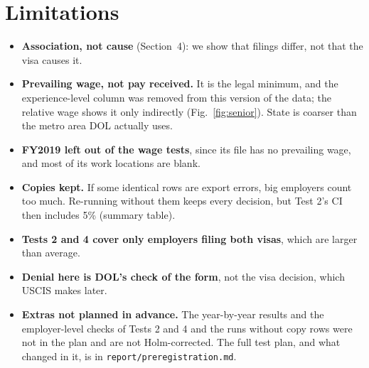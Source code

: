 \documentclass[10pt,a4paper,twocolumn]{article}
\newcommand{\code}[1]{\texttt{#1}}
\begin{document}
\section{Limitations}
\begin{itemize}
  \item \textbf{Association, not cause} (Section~4): we show that filings differ, not that the
  visa causes it.
  \item \textbf{Prevailing wage, not pay received.} It is the legal minimum, and the
  experience-level column was removed from this version of the data; the relative wage shows it
  only indirectly (Fig.~\ref{fig:senior}). State is coarser than the metro area DOL actually uses.
  \item \textbf{FY2019 left out of the wage tests}, since its file has no prevailing wage, and
  most of its work locations are blank.
  \item \textbf{Copies kept.} If some identical rows are export errors, big employers count too
  much. Re-running without them keeps every decision, but Test 2's CI then includes 5\% (summary
  table).
  \item \textbf{Tests 2 and 4 cover only employers filing both visas}, which are larger than average.
  \item \textbf{Denial here is DOL's check of the form}, not the visa decision, which USCIS makes later.
  \item \textbf{Extras not planned in advance.} The year-by-year results and the employer-level
  checks of Tests 2 and 4 and the runs without copy rows were not in the plan and are not
  Holm-corrected. The full test plan, and
  what changed in it, is in \code{report/preregistration.md}.
\end{itemize}
\end{document}
